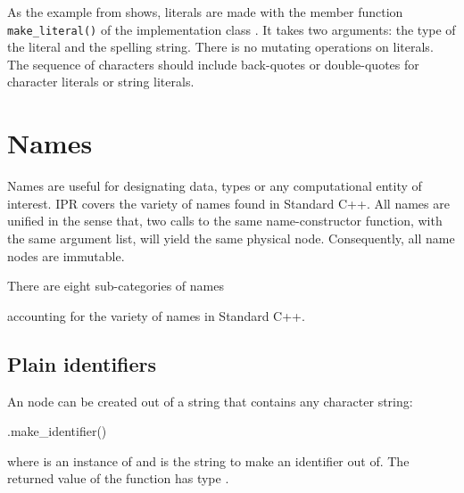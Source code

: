 \documentclass[a4paper,12pt]{article}
\begin{document}
As the example from  shows, literals are made with
the member function \texttt{make\_literal()} of the implementation class
.  It takes two arguments:  the type of the literal and
the spelling string.  There is no mutating operations on literals.  The
sequence of characters should include back-quotes or double-quotes for
character literals or string literals. 

\section{Names}
\label{sec:name}

Names are useful for designating data, types or any computational entity of
interest. IPR covers the variety of names found in Standard C++.
All names are unified in the sense that, two calls to the same
name-constructor function, with the same argument list, will yield the same
physical node. Consequently, all name nodes are immutable.

There are eight sub-categories of names
\begin{Grammar}
\end{Grammar}
accounting for the variety of names in Standard C++.

\subsection{Plain identifiers}
\label{sec:name.identifier}

\begin{Grammar}
      
      
\end{Grammar}
An  node can be created out of a string that contains
any character string:
\begin{Program}
  .make_identifier()
\end{Program}
where  is an instance of  and  is
the string to make an identifier out of.  The returned value of the
function  has type .
\end{document}
